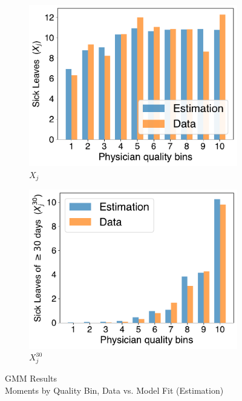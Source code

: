 \documentclass[../main.tex]{subfiles}
\begin{document}
\begin{figure}[H]
    \centering
    \begin{subfigure}[b]{0.46\linewidth}
        \centering
        \includegraphics[width=\linewidth]{result_x.pdf}
        
        \caption{$X_j$}

    \end{subfigure}
    \hspace{0.05\linewidth}  %
    \begin{subfigure}[b]{0.46\linewidth}
        \centering
        \includegraphics[width=\linewidth]{result_x30.pdf}
        
        \caption{$X_j^{30}$}
    \end{subfigure}


\caption{GMM Results \\ Moments by Quality Bin, Data vs. Model Fit (Estimation)}

\end{figure}
\end{document}
